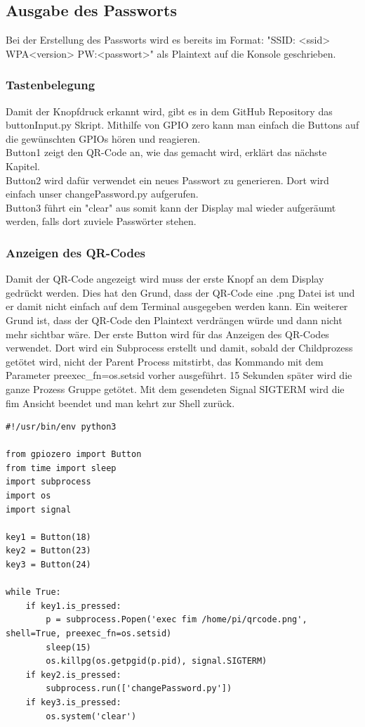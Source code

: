 \documentclass[a4paper,11pt,singlespacing]{article}
\begin{document}
    		
    	\subsection{Ausgabe des Passworts}
    		
    		Bei der Erstellung des Passworts wird es bereits im Format: "SSID: <ssid> WPA<version> PW:<passwort>" als Plaintext auf die Konsole geschrieben.
    		\subsubsection{Tastenbelegung}
    		    Damit der Knopfdruck erkannt wird, gibt es in dem GitHub Repository \cite{Quote_github_repo} das buttonInput.py Skript. Mithilfe von GPIO zero kann man einfach die Buttons auf die gewünschten GPIOs hören und reagieren. \\
	    		Button1 zeigt den QR-Code an, wie das gemacht wird, erklärt das nächste Kapitel. \\
	    		Button2 wird dafür verwendet ein neues Passwort zu generieren. Dort wird einfach unser changePassword.py aufgerufen. \\
	    		Button3 führt ein "clear" aus somit kann der Display mal wieder aufgeräumt werden, falls dort zuviele Passwörter stehen.
    		
    		\subsubsection{Anzeigen des QR-Codes}
    			Damit der QR-Code angezeigt wird muss der erste Knopf an dem Display gedrückt werden. Dies hat den Grund, dass der QR-Code eine .png Datei ist und er damit nicht einfach auf dem Terminal ausgegeben werden kann. Ein weiterer Grund ist, dass der QR-Code den Plaintext verdrängen würde und dann nicht mehr sichtbar wäre. 
    			Der erste Button wird für das Anzeigen des QR-Codes verwendet. Dort wird ein Subprocess erstellt und damit, sobald der Childprozess getötet wird, nicht der Parent Process mitstirbt, das Kommando mit dem Parameter preexec\_fn=os.setsid vorher ausgeführt. 15 Sekunden später wird die ganze Prozess Gruppe getötet. Mit dem gesendeten Signal SIGTERM wird die fim Ansicht beendet und man kehrt zur Shell zurück. \\ 
    			\begin{lstlisting}
#!/usr/bin/env python3

from gpiozero import Button
from time import sleep
import subprocess
import os
import signal

key1 = Button(18)
key2 = Button(23)
key3 = Button(24)

while True:
	if key1.is_pressed:
		p = subprocess.Popen('exec fim /home/pi/qrcode.png', shell=True, preexec_fn=os.setsid)
		sleep(15)
		os.killpg(os.getpgid(p.pid), signal.SIGTERM)
	if key2.is_pressed:
		subprocess.run(['changePassword.py'])
	if key3.is_pressed:
		os.system('clear')
    			\end{lstlisting}
    
\end{document}
